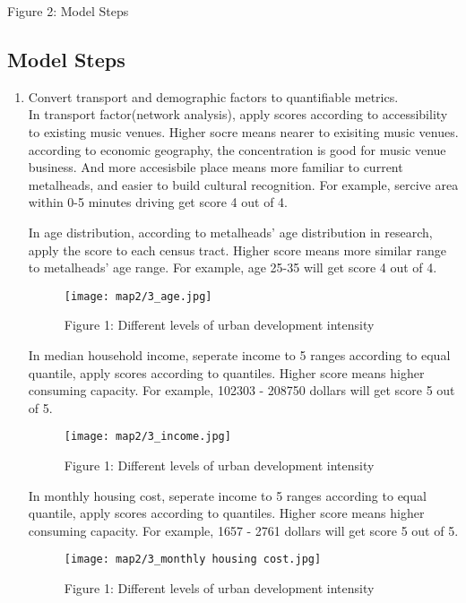\documentclass[11pt]{article}
\begin{document}
\begin{center}
\centering
Figure 2: Model Steps
\end{center}

\subsection{Model Steps}

\begin{enumerate}
\item{Convert transport and demographic factors to quantifiable metrics.\\
In transport factor(network analysis), apply scores according to accessibility to existing  music venues. Higher socre means nearer to exisiting music venues. according to economic geography, the concentration is good for music venue business. And more accesisbile place means more familiar to current metalheads, and easier to build cultural recognition. For example, sercive area within 0-5 minutes driving get score 4 out of 4.

In age distribution, according to metalheads' age distribution in research, apply the score to each census tract. Higher score means more similar range to metalheads' age range. For example, age 25-35 will get score 4 out of 4.
\begin{figure}[H]
\begin{center}
\centering
\texttt{[image: map2/3\_age.jpg]}
\caption{Figure 1: Different levels of urban development intensity}
\label{fig:figure1}
\end{center}
\end{figure}
In median household income, seperate income to 5 ranges according to equal quantile, apply scores according to quantiles. Higher score means higher consuming capacity. For example, 102303 - 208750 dollars will get score 5 out of 5.
\begin{figure}[H]
\begin{center}
\centering
\texttt{[image: map2/3\_income.jpg]}
\caption{Figure 1: Different levels of urban development intensity}
\label{fig:figure1}
\end{center}
\end{figure}
In monthly housing cost, seperate income to 5 ranges according to equal quantile, apply scores according to quantiles. Higher score means higher consuming capacity. For example, 1657 - 2761 dollars will get score 5 out of 5.
\begin{figure}[H]
\begin{center}
\centering
\texttt{[image: map2/3\_monthly housing cost.jpg]}
\caption{Figure 1: Different levels of urban development intensity}
\label{fig:figure1}
\end{center}
\end{figure}
}


\end{enumerate}
\end{document}
